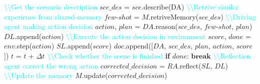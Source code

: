 \documentclass[lettersize,journal]{IEEEtran}
\begin{document}
\begin{algorithm}[!h]
\caption{Autonomous Driving with Multi-agent LLMs}\label{alg:alg1}
\begin{algorithmic}
\STATE 
{} 
\STATE {}
\STATE \hspace{0.5cm}\textcolor{cyan}{\textbackslash\textbackslash \hspace{0.25cm}Get the scenario description}
\STATE \hspace{1cm}$sce\_des$ = $sce$.describe(DA)
\STATE \hspace{0.5cm}\textcolor{cyan}{\textbackslash\textbackslash \hspace{0.25cm}Retrive similar experience from shared-memory}
\STATE \hspace{1cm}$few$-$shot$ = $M$.retriveMemory($sce\_des$)
\STATE \hspace{0.5cm}\textcolor{cyan}{\textbackslash\textbackslash \hspace{0.25cm}Driving agent making action decision}
\STATE \hspace{1cm}$action$, $plan$ = $DA$.reason($sce\_des$, $few$-$shot$, $plan$)\STATE \hspace{1cm}$DL$.append($action$)
\STATE \hspace{0.5cm}\textcolor{cyan}{\textbackslash\textbackslash \hspace{0.25cm}Execute the action decision in environment}
\STATE \hspace{1cm}$score$, $done$ = $env$.step($action$)
\STATE \hspace{1cm}$SL$.append($score$)
\STATE \hspace{1cm}$doc$.append([$DA$, $sce\_des$, $plan$, $action$, $score$])
\STATE \hspace{1cm}$t$ = $t$ + $\Delta$$t$
\STATE \hspace{0.5cm}\textcolor{cyan}{\textbackslash\textbackslash \hspace{0.25cm}Check whether the scene is finished}
\STATE \hspace{1cm}\textbf{if} $done$:
\STATE \hspace{1.5cm}$\textbf{break}$
\STATE \textcolor{cyan}{\textbackslash\textbackslash \hspace{0.25cm}Reflection agent correct the wrong action}
\STATE $corrected\_decision$ = $RA$.reflect($SL$, $DL$)
\STATE \textcolor{cyan}{\textbackslash\textbackslash \hspace{0.25cm}Update the memory}
\STATE $M$.update($corrected\_decision$)
\end{algorithmic}
\label{alg1}
\end{algorithm}
\end{document}
